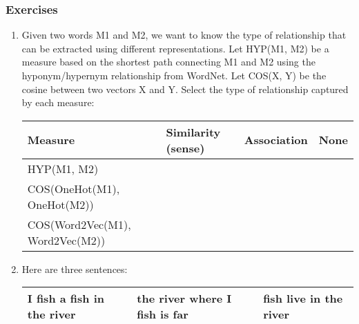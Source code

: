 \documentclass{KBook}
\begin{document}



\subsubsection*{Exercises}

\begin{enumerate}
	\item Given two words M1 and M2, we want to know the type of relationship that can be extracted using different representations. Let HYP(M1, M2) be a measure based on the shortest path connecting M1 and M2 using the hyponym/hypernym relationship from WordNet. Let COS(X, Y) be the cosine between two vectors X and Y. Select the type of relationship captured by each measure:
	
	\begin{tabular}{|llll|}
		\hline 
		Measure & Similarity (sense) & Association & None\\
		\hline
		HYP(M1, M2) & \Square & \Square & \Square \\
		COS(OneHot(M1), OneHot(M2)) & \Square & \Square & \Square \\
		COS(Word2Vec(M1), Word2Vec(M2)) & \Square & \Square & \Square \\
		\hline
	\end{tabular}
	
	\item Here are three sentences:
	
	\begin{tabular}{|lll|}
		\hline 
		I fish a fish in the river & the river where I fish is far & fish live in the river\\
		\hline
	\end{tabular}
	

\end{enumerate}
\end{document}
